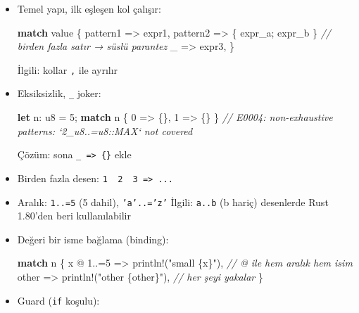 \documentclass[12pt,a4paper]{article}
\newenvironment{Shaded}{}{}
\newcommand{\CommentTok}[1]{\textcolor[rgb]{0.38,0.63,0.69}{\textit{#1}}}
\newcommand{\ControlFlowTok}[1]{\textcolor[rgb]{0.00,0.44,0.13}{\textbf{#1}}}
\newcommand{\DataTypeTok}[1]{\textcolor[rgb]{0.56,0.13,0.00}{#1}}
\newcommand{\DecValTok}[1]{\textcolor[rgb]{0.25,0.63,0.44}{#1}}
\newcommand{\KeywordTok}[1]{\textcolor[rgb]{0.00,0.44,0.13}{\textbf{#1}}}
\newcommand{\NormalTok}[1]{#1}
\newcommand{\OperatorTok}[1]{\textcolor[rgb]{0.40,0.40,0.40}{#1}}
\newcommand{\StringTok}[1]{\textcolor[rgb]{0.25,0.44,0.63}{#1}}
\begin{document}
\begin{itemize}
\item
  Temel yapı, ilk eşleşen kol çalışır:

\begin{Shaded}
\begin{Highlighting}[]
\ControlFlowTok{match}\NormalTok{ value }\OperatorTok{\{}
\NormalTok{    pattern1 }\OperatorTok{=\textgreater{}}\NormalTok{ expr1}\OperatorTok{,}
\NormalTok{    pattern2 }\OperatorTok{=\textgreater{}} \OperatorTok{\{}\NormalTok{ expr\_a}\OperatorTok{;}\NormalTok{ expr\_b }\OperatorTok{\}}   \CommentTok{// birden fazla satır → süslü parantez}
\NormalTok{    \_ }\OperatorTok{=\textgreater{}}\NormalTok{ expr3}\OperatorTok{,}
\OperatorTok{\}}
\end{Highlighting}
\end{Shaded}


  İlgili: kollar \texttt{,} ile ayrılır
\item
  Eksiksizlik, \texttt{\_} joker:

\begin{Shaded}
\begin{Highlighting}[]
\KeywordTok{let}\NormalTok{ n}\OperatorTok{:} \DataTypeTok{u8} \OperatorTok{=} \DecValTok{5}\OperatorTok{;}
\ControlFlowTok{match}\NormalTok{ n }\OperatorTok{\{} \DecValTok{0} \OperatorTok{=\textgreater{}} \OperatorTok{\{\},} \DecValTok{1} \OperatorTok{=\textgreater{}} \OperatorTok{\{\}} \OperatorTok{\}}
\CommentTok{// E0004: non-exhaustive patterns: `2\_u8..=u8::MAX` not covered}
\end{Highlighting}
\end{Shaded}


  Çözüm: sona \texttt{\_\ =\textgreater{}\ \{\}} ekle
\item
  Birden fazla desen: \texttt{1\ \textbar{}\ 2\ \textbar{}\ 3\ =\textgreater{}\ ...}
\item
  Aralık: \texttt{1..=5} (5 dahil), \texttt{'a'..='z'}
  İlgili: \texttt{a..b} (b hariç) desenlerde Rust 1.80'den beri kullanılabilir
\item
  Değeri bir isme bağlama (binding):

\begin{Shaded}
\begin{Highlighting}[]
\ControlFlowTok{match}\NormalTok{ n }\OperatorTok{\{}
\NormalTok{    x }\OperatorTok{@} \DecValTok{1}\OperatorTok{..=}\DecValTok{5} \OperatorTok{=\textgreater{}}\NormalTok{ println}\OperatorTok{!(}\StringTok{"small \{x\}"}\OperatorTok{),}   \CommentTok{// @ ile hem aralık hem isim}
\NormalTok{    other }\OperatorTok{=\textgreater{}}\NormalTok{ println}\OperatorTok{!(}\StringTok{"other \{other\}"}\OperatorTok{),}   \CommentTok{// her şeyi yakalar}
\OperatorTok{\}}
\end{Highlighting}
\end{Shaded}
\item
  Guard (\texttt{if} koşulu):


\end{itemize}
\end{document}
